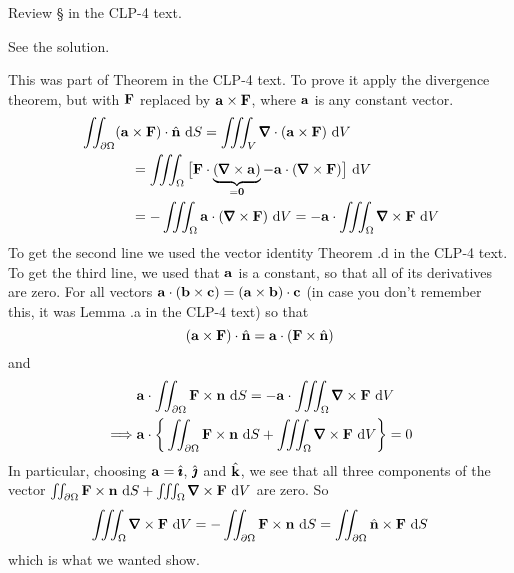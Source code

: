 \begin{hint} 
Review \S{} in the CLP-4 text.
\end{hint}

\begin{answer} 
See the solution.
\end{answer}

\begin{solution}
This was part of Theorem  in the CLP-4 text. 
To prove it apply the divergence theorem, but with
$\mathbf{F}$ replaced by $\mathbf{a}\times\mathbf{F}$, where $\mathbf{a}$ is any constant vector.
\begin{align*}
&\dblInt_{\partial \Omega} (\va\times\vF)\cdot\hn\ \dee{S}
=\tripInt_V\vnabla\cdot(\va\times\vF)\ \dee{V} \\
&\hskip0.5in
=\tripInt_\Omega\big[\vF\cdot\underbrace{(\vnabla \times \va)}_{=\vZero}
  -\va\cdot(\vnabla\times\vF)\big]\ \dee{V}  \\
&\hskip0.5in=-\tripInt_\Omega\va\cdot(\vnabla \times\vF)\ \dee{V}
=-\va\cdot\tripInt_\Omega\vnabla \times\vF\ \dee{V}
\end{align*}
To get the second line we used the vector identity Theorem .d in the CLP-4 text.
To get the third line, we used that $\mathbf{a}$ is a constant, so that
all of its derivatives are zero. For all vectors 
$\mathbf{a}\cdot(\mathbf{b}\times\mathbf{c})=(\mathbf{a}\times\mathbf{b})\cdot\mathbf{c}$ (in case you don't
remember this, it was Lemma .a in the CLP-4 text) 
so that
\begin{equation*}
(\mathbf{a}\times\mathbf{F})\cdot\hat{\mathbf{n}}
=\mathbf{a}\cdot(\mathbf{F}\times\hat{\mathbf{n}})
\end{equation*}
and
\begin{align*}
&\va\cdot\dblInt_{\partial \Omega} \vF\times\vn\ \dee{S}
=-\va\cdot\tripInt_\Omega\vnabla \times\vF\ \dee{V} \\
\implies &\va\cdot\bigg\{\dblInt_{\partial \Omega} \vF\times\vn\ \dee{S}
+\tripInt_\Omega\vnabla\times\vF\ \dee{V}\bigg\}=0
\end{align*}
In particular, choosing $\mathbf{a}=\hat{\pmb{\imath}}$, $\hat{\pmb{\jmath}}$ and $\hat{\mathbf{k}}$, we see that
all three components of the vector 
$\dblInt_{\partial \Omega} \vF\times\vn\ \dee{S}
+\tripInt_\Omega\vnabla\times\vF\ \dee{V}$ are zero. So 
\begin{equation*}
\tripInt_\Omega\vnabla\times\vF\ \dee{V}
=-\dblInt_{\partial \Omega} \vF\times\vn\ \dee{S}
=\dblInt_{\partial \Omega} \hn\times\vF\ \dee{S}
\end{equation*}
which is what we wanted show.
\end{solution}

